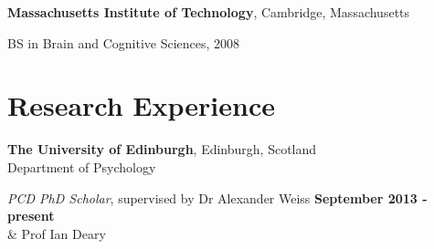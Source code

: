 \documentclass[margin,line]{res}
\newenvironment{list1}{
  \begin{list}{\ding{113}}{%
      \setlength{\itemsep}{0in}
      \setlength{\parsep}{0in} \setlength{\parskip}{0in}
      \setlength{\topsep}{0in} \setlength{\partopsep}{0in} 
      \setlength{\leftmargin}{0.17in}}}{\end{list}}
\begin{document}
\begin{resume}
{\bf Massachusetts Institute of Technology}, Cambridge, Massachusetts\\
\vspace*{-.1in}
\begin{list1}
\item[] BS in Brain and Cognitive Sciences, 2008
\vspace*{.05in}
\end{list1}



\vspace{0.1cm}


\section{\sc Research Experience}

{\bf The University of Edinburgh}, Edinburgh, Scotland \\
Department of Psychology

\vspace{-.2cm}
{\em PCD PhD Scholar}, supervised by Dr Alexander Weiss \hfill {\bf September 2013 - present}\\
\-\hspace{4.75cm} \& Prof Ian Deary
\vspace{-.1cm}



\end{resume}
\end{document}
